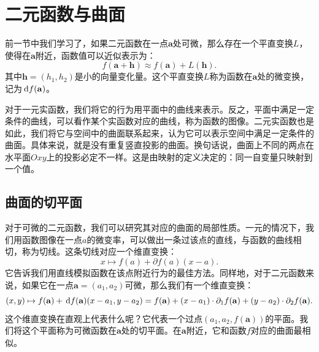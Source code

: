 \documentclass[12pt,UTF8]{ctexbook}
\begin{document}
\chapter{二元函数与曲面}

前一节中我们学习了，如果二元函数在一点$\mathbf{a}$处可微，那么存在一个平直变换$L$，使得在$\mathbf{a}$附近，函数值可以近似表示为：
$$ f(\mathbf{a} + \mathbf{h}) \approx f(\mathbf{a}) + L(\mathbf{h}). $$
其中$\mathbf{h} = (h_1,h_2)$是小的向量变化量。这个平直变换$L$称为函数在$\mathbf{a}$处的微变换，记为$\,\mathrm{d} f(\mathbf{a})$。

对于一元实函数，我们将它的行为用平面中的曲线来表示。反之，平面中满足一定条件的曲线，可以看作某个实函数对应的曲线，称为函数的图像。二元实函数也是如此，我们将它与空间中的曲面联系起来，认为它可以表示空间中满足一定条件的曲面。具体来说，就是没有重复竖直投影的曲面。换句话说，曲面上不同的两点在水平面$Oxy$上的投影必定不一样。这是由映射的定义决定的：同一自变量只映射到一个值。

\section{曲面的切平面}

对于可微的二元函数，我们可以研究其对应的曲面的局部性质。一元的情况下，我们用函数图像在一点$a$的微变率，可以做出一条过该点的直线，与函数的曲线相切，称为切线。这条切线对应一个维直变换：
$$ x\mapsto f(a) + \partial f(a) (x - a).$$
它告诉我们用直线模拟函数在该点附近行为的最佳方法。同样地，对于二元函数来说，如果它在一点$\mathbf{a} = (a_1, a_2)$可微，那么我们有一个维直变换：
$$ (x, y) \mapsto f(\mathbf{a}) + \,\mathrm{d} f(\mathbf{a}) (x - a_1, y - a_2) = f(\mathbf{a}) + (x - a_1)\cdot\partial_1 f(\mathbf{a}) + (y - a_2)\cdot\partial_2 f(\mathbf{a}) .$$
这个维直变换在直观上代表什么呢？它代表一个过点$(a_1, a_2, f(\mathbf{a}))$的平面。我们将这个平面称为可微函数在$\mathbf{a}$处的切平面。在$\mathbf{a}$附近，它和函数$f$对应的曲面最相似。
\end{document}
